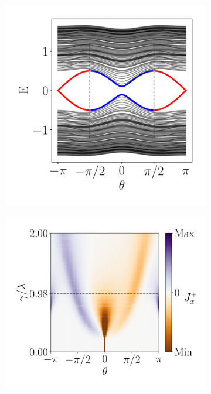 \begin{figure}[h!]
     \centering
    \captionsetup[sub]{font=small}
     \begin{minipage}[h!]{1\textwidth}
         \begin{subfigure}[b!]{0.3 \textwidth}
             \caption{}
             \includegraphics[width=\textwidth]{Imagenes/Resultados_pump_Cuadrado/x/param_pump_A=0.5x.pdf}
             \label{}
         \end{subfigure}\hspace*{-0.5em}
         \begin{subfigure}[b!]{0.35 \textwidth}
             \caption{}
             \includegraphics[width=\textwidth]{Imagenes/Resultados_pump_Cuadrado/x/current_square_pumpx.pdf}

\end{subfigure}
\end{minipage}
\end{figure}
